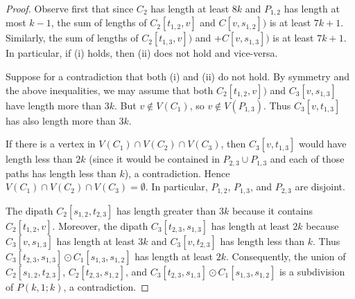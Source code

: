 \documentclass[utf8,10pt]{article}
\theoremstyle{plain}
\theoremstyle{definition}
\theoremstyle{remark}
\begin{document}
\begin{proof}
Observe first that since $C_2$ has length at least $8k$ and $P_{1,2}$ has length at most $k-1$, the sum of lengths of $C_2[t_{1,2}, v]$ and  $C[v, s_{1,2}])$ is at least $7k+1$. Similarly, the sum of lengths of $C_2[t_{1,3}, v])$ and +$C[v, s_{1,3}])$ is at least $7k+1$. In particular, if (i) holds, then (ii) does not hold and vice-versa.


Suppose for a contradiction that both (i) and (ii) do not hold. By symmetry and the above inequalities, we may assume that both $C_2[t_{1,2}, v])$ and $C_3[v, s_{1,3}]$ have length more than $3k$.
But $v\notin V(C_1)$, so $v\notin V(P_{1,3})$. Thus $C_3[v, t_{1,3}]$  has also length more than $3k$. 

If there is a vertex in $V(C_1)\cap V(C_2)\cap V(C_3)$, then $C_3[v,t_{1,3}]$ would have length less than $2k$ (since it would be contained in $P_{2,3}\cup P_{1,3}$ and each of those paths has length less than $k$), a contradiction.
Hence $V(C_1)\cap V(C_2)\cap V(C_3)=\emptyset$. In particular, $P_{1,2}$, $P_{1,3}$, and $P_{2,3}$ are disjoint.

The dipath  $C_2[s_{1,2}, t_{2,3}]$ has length greater than $3k$ because it contains $C_2[t_{1,2},v]$. Moreover, the dipath $C_3[t_{2,3}, s_{1,3}]$ 
has length at least $2k$ because $C_3[v, s_{1,3}]$ has length at least $3k$ and $C_3[v,t_{2,3}]$ has length less than $k$.
Thus $C_3[t_{2,3}, s_{1,3}]\odot C_1[s_{1,3}, s_{1,2}]$ has length at least $2k$.
Consequently, the union of $C_2[s_{1,2}, t_{2,3}]$, $C_2[t_{2,3}, s_{1,2}]$, and $C_3[t_{2,3}, s_{1,3}]\odot C_1[s_{1,3}, s_{1,2}]$  is a subdivision of $P(k,1;k)$, a contradiction.
\end{proof}



\end{document}
